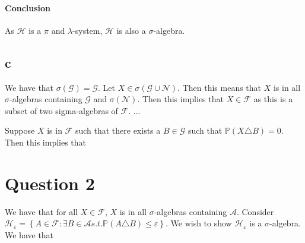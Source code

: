 \documentclass{article}
\theoremstyle{definition}
\numberwithin{theorem}{section}
\numberwithin{equation}{section}
\begin{document}
\paragraph{Conclusion}
As $\mathcal{H}$ is a $\pi$ and $\lambda$-system, $\mathcal{H}$ is also a $\sigma$-algebra. 

\subsection{c}
We have that $\sigma(\mathcal{G}) = \mathcal{G}$. 
Let $X \in \sigma(\mathcal{G} \cup \mathcal{N})$. Then this means that $X$ is in all $\sigma$-algebras containing $\mathcal{G}$ and $\sigma(\mathcal{N})$. Then this implies that $X \in \mathcal{F}$ as this is a subset of two sigma-algebras of $\mathcal{F}$. ...

Suppose $X$ is in $\mathcal{F}$ such that there exists a $B \in \mathcal{G}$ such that $\mathbb{P}(X \triangle B) = 0$. Then this implies that 


\section{Question 2}
We have that for all $X \in \mathcal{F}$, $X$ is in all $\sigma$-algebras containing $\mathcal{A}$. Consider $\mathcal{H}_\varepsilon = \left\{ A \in \mathcal{F}: \exists B \in \mathcal{A} s.t. \mathbb{P}(A \triangle B) \leq \varepsilon \right\}$. We wish to show $\mathcal{H}_\varepsilon$ is a $\sigma$-algebra. We have that 
\end{document}
